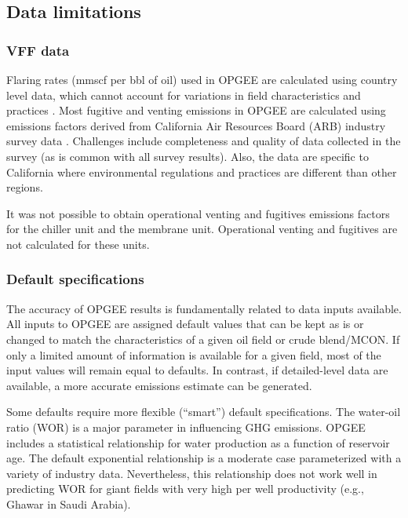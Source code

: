 \documentclass[11pt]{report}
\begin{document}
\subsection{Data limitations}

\subsubsection{VFF data}

Flaring rates (mmscf per bbl of oil) used in OPGEE are calculated using country level data, which cannot account for variations in field characteristics and practices \cite{NOAA2010,EIA2010}. Most fugitive and venting emissions in OPGEE are calculated using emissions factors derived from California Air Resources Board (ARB) industry survey data \cite{Lee2011}. Challenges include completeness and quality of data collected in the survey (as is common with all survey results). Also, the data are specific to California where environmental regulations and practices are different than other regions.\par

It was not possible to obtain operational venting and fugitives emissions factors for the chiller unit and the membrane unit. Operational venting and fugitives are not calculated for these units. 

\subsubsection{Default specifications}

The accuracy of OPGEE results is fundamentally related to data inputs available. All inputs to OPGEE are assigned default values that can be kept as is or changed to match the characteristics of a given oil field or crude blend/MCON. If only a limited amount of information is available for a given field, most of the input values will remain equal to defaults. In contrast, if detailed-level data are available, a more accurate emissions estimate can be generated. \par

Some defaults require more flexible (``smart'') default specifications. The water-oil ratio (WOR) is a major parameter in influencing GHG emissions. OPGEE includes a statistical relationship for water production as a function of reservoir age. The default exponential relationship is a moderate case parameterized with a variety of industry data. Nevertheless, this relationship does not work well in predicting WOR for giant fields with very high per well productivity (e.g., Ghawar in Saudi Arabia). \par
\end{document}

